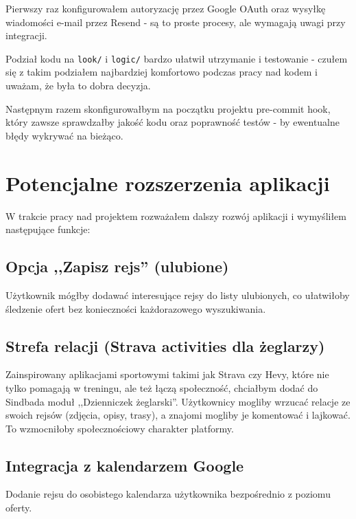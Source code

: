 \documentclass[shortabstract]{iithesis}
\begin{document}
Pierwszy raz konfigurowałem autoryzację przez Google OAuth oraz wysyłkę wiadomości e-mail przez Resend - są to proste procesy, ale wymagają uwagi przy integracji.

Podział kodu na \texttt{look/} i \texttt{logic/} bardzo ułatwił utrzymanie i testowanie - czułem się z takim podziałem najbardziej komfortowo podczas pracy nad kodem i uważam, że była to dobra decyzja.

Następnym razem skonfigurowałbym na początku projektu pre-commit hook, który zawsze sprawdzałby jakość kodu oraz poprawność testów - by ewentualne błędy wykrywać na bieżąco.

\section{Potencjalne rozszerzenia aplikacji}

W trakcie pracy nad projektem rozważałem dalszy rozwój aplikacji i wymyśliłem następujące funkcje:

\subsection{Opcja ,,Zapisz rejs'' (ulubione)}
Użytkownik mógłby dodawać interesujące rejsy do listy ulubionych, co ułatwiłoby śledzenie ofert bez konieczności każdorazowego wyszukiwania.

\subsection{Strefa relacji (Strava activities dla żeglarzy)}
Zainspirowany aplikacjami sportowymi takimi jak Strava czy Hevy, które nie tylko pomagają w treningu, ale też łączą społeczność, chciałbym dodać do Sindbada moduł ,,Dzienniczek żeglarski''. Użytkownicy mogliby wrzucać relacje ze swoich rejsów (zdjęcia, opisy, trasy), a znajomi mogliby je komentować i lajkować. To wzmocniłoby społecznościowy charakter platformy.

\subsection{Integracja z kalendarzem Google}
Dodanie rejsu do osobistego kalendarza użytkownika bezpośrednio z poziomu oferty.


\end{document}
